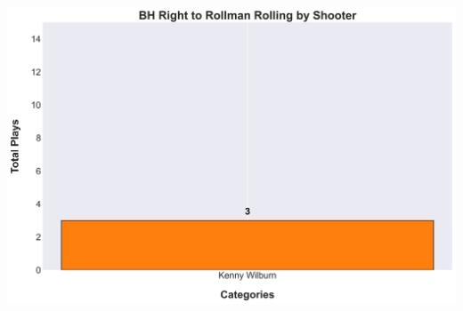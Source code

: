 \documentclass[a4paper,12pt]{article}
\begin{document}
\begin{table}[H]
{\begin{minipage}[t]{0.6\textwidth}
{\begin{tabular}
            \bottomrule
        \end{tabular}
        } %
    \end{minipage}
    } %
    \hfill %
    \begin{minipage}[c]{0.35\textwidth} %
        \flushright
        \includegraphics[width=\textwidth, height=.14\textheight]{images/PNR_PassRightRollsPlayer_Freq.png} %
    \end{minipage}
\end{table}

\vspace{-1em} %
\vspace{-1em} %
\end{document}
